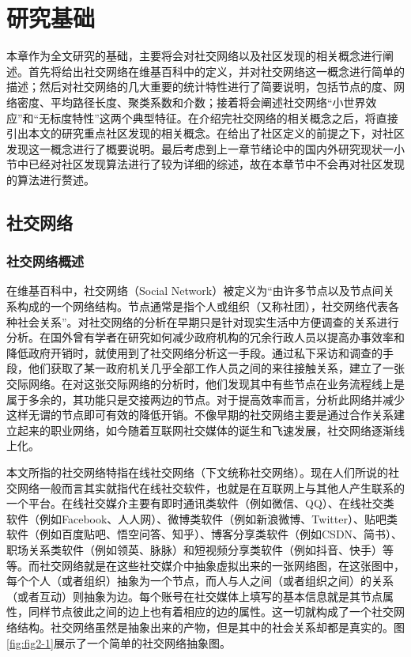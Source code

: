 \chapter{研究基础}
本章作为全文研究的基础，主要将会对社交网络以及社区发现的相关概念进行阐述。首先将给出社交网络在维基百科中的定义，并对社交网络这一概念进行简单的描述；然后对社交网络的几大重要的统计特性进行了简要说明，包括节点的度、网络密度、平均路径长度、聚类系数和介数；接着将会阐述社交网络“小世界效应”和“无标度特性”这两个典型特征。在介绍完社交网络的相关概念之后，将直接引出本文的研究重点社区发现的相关概念。在给出了社区定义的前提之下，对社区发现这一概念进行了概要说明。最后考虑到上一章节绪论中的国内外研究现状一小节中已经对社区发现算法进行了较为详细的综述，故在本章节中不会再对社区发现的算法进行赘述。

\section{社交网络}
\subsection{社交网络概述}
在维基百科中，社交网络（Social Network）被定义为“由许多节点以及节点间关系构成的一个网络结构。节点通常是指个人或组织（又称社团），社交网络代表各种社会关系”\cite{wiki:SN}。对社交网络的分析在早期只是针对现实生活中方便调查的关系进行分析。在国外曾有学者在研究如何减少政府机构的冗余行政人员以提高办事效率和降低政府开销时，就使用到了社交网络分析这一手段。通过私下采访和调查的手段，他们获取了某一政府机关几乎全部工作人员之间的来往接触关系，建立了一张交际网络。在对这张交际网络的分析时，他们发现其中有些节点在业务流程线上是属于多余的，其功能只是交接两边的节点。对于提高效率而言，分析此网络并减少这样无谓的节点即可有效的降低开销。不像早期的社交网络主要是通过合作关系建立起来的职业网络，如今随着互联网社交媒体的诞生和飞速发展，社交网络逐渐线上化。

本文所指的社交网络特指在线社交网络（下文统称社交网络）。现在人们所说的社交网络一般而言其实就指代在线社交软件，也就是在互联网上与其他人产生联系的一个平台。在线社交媒介主要有即时通讯类软件（例如微信、QQ）、在线社交类软件（例如Facebook、人人网）、微博类软件（例如新浪微博、Twitter）、贴吧类软件（例如百度贴吧、悟空问答、知乎）、博客分享类软件（例如CSDN、简书）、职场关系类软件（例如领英、脉脉）和短视频分享类软件（例如抖音、快手）等等。而社交网络就是在这些社交媒介中抽象虚拟出来的一张网络图，在这张图中，每个个人（或者组织）抽象为一个节点，而人与人之间（或者组织之间）的关系（或者互动）则抽象为边。每个账号在社交媒体上填写的基本信息就是其节点属性，同样节点彼此之间的边上也有着相应的边的属性。这一切就构成了一个社交网络结构。社交网络虽然是抽象出来的产物，但是其中的社会关系却都是真实的。图\ref{fig:fig2-1}展示了一个简单的社交网络抽象图。

